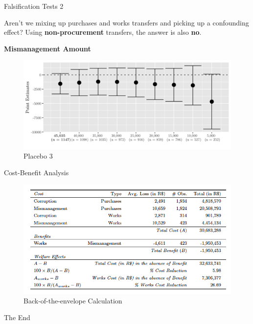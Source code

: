 \documentclass[10pt,ignorenonframetext,]{beamer}
\begin{document}
\begin{frame}{Falsification Tests 2}
\protect\hypertarget{falsification-tests-2-2}{}

Aren't we mixing up purchases and works transfers and picking up a
confounding effect? Using \textbf{non-procurement} transfers, the answer
is also \textbf{no}.

\textbf{Mismanagement Amount}

\begin{figure}
\centering
\includegraphics{./images/02falsificationplot3.png}
\caption{Placebo 3}
\end{figure}

\end{frame}

\begin{frame}{Cost-Benefit Analysis}
\protect\hypertarget{cost-benefit-analysis}{}

\begin{figure}
\centering
\includegraphics{./images/cba.png}
\caption{Back-of-the-envelope Calculation}
\end{figure}

\end{frame}

\begin{frame}{The End}
\protect\hypertarget{the-end}{}

\end{frame}
\end{document}
